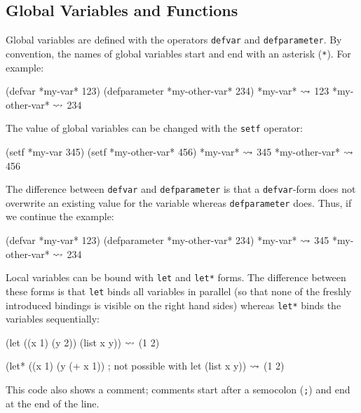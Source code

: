 \documentclass[a4paper]{amsart}
\begin{document}
\subsection{Global Variables and Functions}
\label{sec:glob-vari-funct}

Global variables are defined with the operators \texttt{defvar} and
\texttt{defparameter}.  By convention, the names of global variables
start and end with an asterisk (\verb|*|).  For example:
\begin{Code}
  (defvar *my-var* 123)
  (defparameter *my-other-var* 234)
  *my-var*                         $\rightsquigarrow$ 123
  *my-other-var*                   $\rightsquigarrow$ 234
\end{Code}
The value of global variables can be changed with the \texttt{setf}
operator:
\begin{Code}
  (setf *my-var 345)
  (setf *my-other-var* 456)
  *my-var*                         $\rightsquigarrow$ 345
  *my-other-var*                   $\rightsquigarrow$ 456
\end{Code}
The difference between \texttt{defvar} and \texttt{defparameter} is
that a \texttt{defvar}-form does not overwrite an existing value for
the variable whereas \texttt{defparameter} does.  Thus, if we continue
the example:
\begin{Code}
  (defvar *my-var* 123)
  (defparameter *my-other-var* 234)
  *my-var*                         $\rightsquigarrow$ 345
  *my-other-var*                   $\rightsquigarrow$ 234  
\end{Code}

Local variables can be bound with \texttt{let} and \texttt{let*}
forms.  The difference between these forms is that \texttt{let} binds
all variables in parallel (so that none of the freshly introduced
bindings is visible on the right hand sides) whereas \texttt{let*}
binds the variables sequentially:
\begin{Code}
  (let ((x 1)
        (y 2))
    (list x y))                                   $\rightsquigarrow$ (1 2)

  (let* ((x 1)
         (y (+ x 1)) ; not possible with let
    (list x y))                                   $\rightsquigarrow$ (1 2)
\end{Code}
This code also shows a comment; comments start after a semocolon
(\verb|;|) and end at the end of the line.
\end{document}
